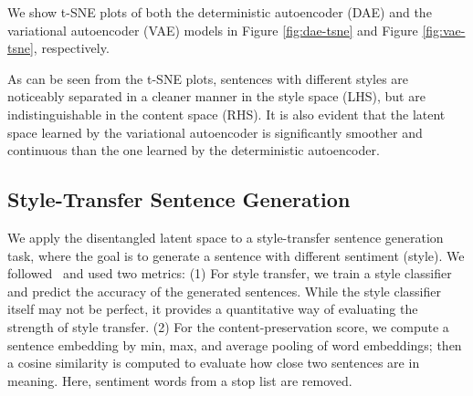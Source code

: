 \documentclass[11pt,a4paper]{article}
\begin{document}
\begin{table}[!t]
	\centering
	\caption{Style classification accuracy.}
	\label{tab:classification}
\end{table}

We show t-SNE plots of both the deterministic autoencoder (DAE) and the variational autoencoder (VAE) models in Figure \ref{fig:dae-tsne} and Figure \ref{fig:vae-tsne}, respectively.


As can be seen from the t-SNE plots, sentences with different styles are noticeably separated in a cleaner manner in the style space (LHS), but are indistinguishable in the content space (RHS). It is also evident that the latent space learned by the variational autoencoder is significantly smoother and continuous than the one learned by the deterministic autoencoder.


\subsection{Style-Transfer Sentence Generation}

We apply the disentangled latent space to a style-transfer sentence generation task, where the goal is to generate a sentence with different sentiment (style). We followed~ and used two metrics: (1) For style transfer, we train a style classifier and predict the accuracy of the generated sentences. While the style classifier itself may not be perfect, it provides a quantitative way of evaluating the strength of style transfer. (2) For the content-preservation score, we compute a sentence embedding by min, max, and average pooling of word embeddings; then a cosine similarity is computed to evaluate how close two sentences are in meaning. Here, sentiment words from a stop list \cite{hu2004mining} are removed.
\end{document}
